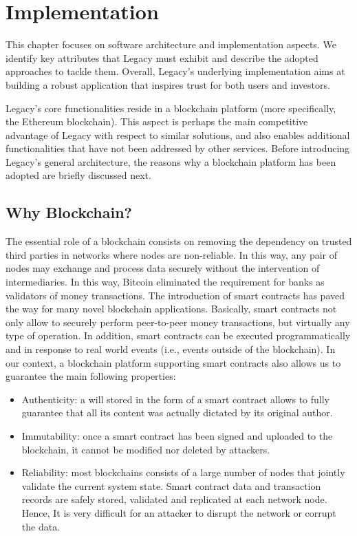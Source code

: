 \chapter{Implementation} %
\label{cha:implementation}

This chapter focuses on software architecture and implementation aspects. We identify key attributes that Legacy must exhibit and describe the adopted approaches to tackle them. Overall, Legacy’s underlying implementation aims at building a robust application that inspires trust for both users and investors.

Legacy’s core functionalities reside in a blockchain platform (more specifically, the Ethereum blockchain). This aspect is perhaps the main competitive advantage of Legacy with respect to similar solutions, and also enables additional functionalities that have not been addressed by other services. Before introducing Legacy’s general architecture, the reasons why a blockchain platform has been adopted are briefly discussed next.


\section{Why Blockchain?} %
\label{sec:why_blockchain_}

The essential role of a blockchain consists on removing the dependency on trusted third parties in networks where nodes are non-reliable. In this way, any pair of nodes may exchange and process data securely without the intervention of intermediaries. In this way, Bitcoin eliminated the requirement for banks as validators of money transactions. The introduction of smart contracts has paved the way for many novel blockchain applications. Basically, smart contracts not only allow to securely perform peer-to-peer money transactions, but virtually any type of operation. In addition, smart contracts can be executed programmatically and in response to real world events (i.e., events outside of the blockchain). In our context, a blockchain platform supporting smart contracts also allows us to guarantee the main following properties: 

\begin{itemize}
	\item Authenticity: a will stored in the form of a smart contract allows to fully guarantee that all its content was actually dictated by its original author.
	\item Immutability: once a smart contract has been signed and uploaded to the blockchain, it cannot be modified nor deleted by attackers.
	\item Reliability: most blockchains consists of a large number of nodes that jointly validate the current system state. Smart contract data and transaction records are safely stored, validated and replicated at each network node. Hence, It is very difficult for an attacker to disrupt the network or corrupt the data.
\end{itemize}

